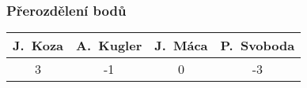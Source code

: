 \documentclass{beamer}
\begin{document}
\begin{frame}[allowframebreaks]\frametitle{Přerozdělení bodů}
    
    \begin{center}
  \begin{tabular}{| c | c | c | c |}
    \hline
     J.~Koza & A.~Kugler & J.~Máca & P.~Svoboda \\
    \hline
     3 & -1 & 0 & -3 \\
    \hline
  \end{tabular}     
   \end{center}
\end{frame}
\end{document}
